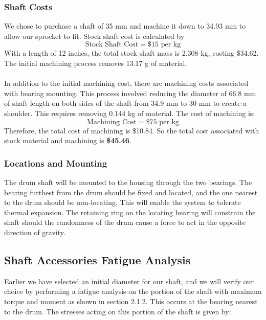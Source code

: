 \documentclass[letterpaper,12pt]{article}
\begin{document}
\subsubsection{Shaft Costs}
We chose to purchase a shaft of 35 mm and machine it down to 34.93 mm to allow our sprocket to fit. Stock shaft cost is calculated by
\begin{equation*}
    \text{Stock Shaft Cost} = \$15 \text{ per kg}    
\end{equation*}
With a length of 12 inches, the total stock shaft mass is 2.308 kg, costing \$34.62. The initial machining process removes 13.17 g of material.
\\\\
In addition to the initial machining cost, there are machining costs associated with bearing mounting. This process involved reducing the diameter of 66.8 mm of shaft length on both sides of the shaft from 34.9 mm to 30 mm to create a shoulder. This requires removing 0.144 kg of material. The cost of machining is:
\begin{equation*}
    \text{Machining Cost} = \$75 \text{ per kg}   
\end{equation*}
Therefore, the total cost of machining is \$10.84. So the total cost associated with stock material and machining is \textbf{\$45.46}.

\subsubsection{Locations and Mounting}
The drum shaft will be mounted to the housing through the two bearings. The bearing furthest from the drum should be fixed and located, and the one nearest to the drum should be non-locating. This will enable the system to tolerate thermal expansion. The retaining ring on the locating bearing will constrain the shaft should the randomness of the drum cause a force to act in the opposite direction of gravity.


\subsection{Shaft Accessories Fatigue Analysis}

Earlier we have selected an initial diameter for our shaft, and we will verify our choice by performing a fatigue analysis on the portion of the shaft with maximum torque and moment as shown in section 2.1.2. This occurs at the bearing nearest to the drum. The stresses acting on this portion of the shaft is given by:
\end{document}
